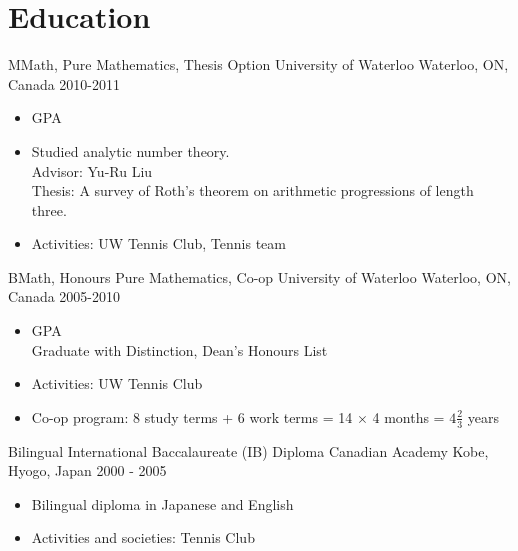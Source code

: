 \section{Education}
\cventry
  {MMath, Pure Mathematics, Thesis Option} %
  {University of Waterloo} %
  {Waterloo, ON, Canada} %
  {2010-2011} %
  {
    \begin{itemize} %
      \liststyle
      \item {GPA}
      \item {Studied analytic number theory.\\
        Advisor: Yu-Ru Liu\\
        Thesis: A survey of Roth's theorem on arithmetic progressions of length three.}
      \item {Activities: UW Tennis Club, Tennis team}
    \end{itemize}
  }

\cventry
  {BMath, Honours Pure Mathematics, Co-op} %
  {University of Waterloo} %
  {Waterloo, ON, Canada} %
  {2005-2010} %
  {
    \begin{itemize} %
      \liststyle
      \item {GPA\\
        Graduate with Distinction, Dean's Honours List}
      \item {Activities: UW Tennis Club}
      \item {Co-op program: 8 study terms + 6 work terms = 14 $\times$ 4 months = $4 \frac{2}{3}$ years}
    \end{itemize}
  }

\cventry
  {Bilingual International Baccalaureate (IB) Diploma} %
  {Canadian Academy} %
  {Kobe, Hyogo, Japan} %
  {2000 - 2005} %
  {
    \begin{itemize} %
      \liststyle
      \item {Bilingual diploma in Japanese and English}
      \item {Activities and societies: Tennis Club}
    \end{itemize}
  }
